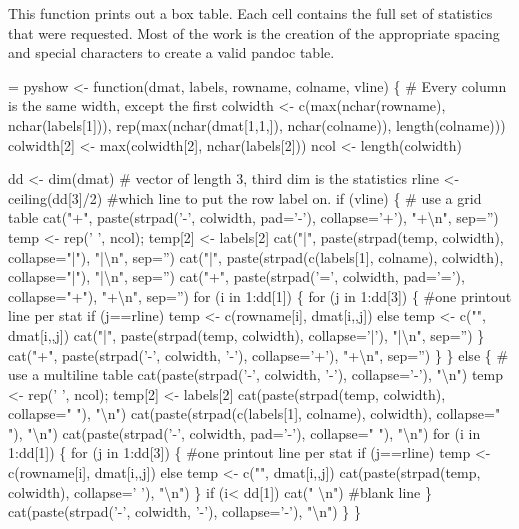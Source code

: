 \documentclass{article}
\begin{document}
This function prints out a box table.  Each cell contains the full set of
statistics that were requested.  Most of the work is the creation of
the appropriate spacing and special characters to create a valid
pandoc table.
\begin{nwchunk}
=
 pyshow <- function(dmat, labels, rowname, colname, vline) \{
     # Every column is the same width, except the first
     colwidth <- c(max(nchar(rowname), nchar(labels[1])),
                   rep(max(nchar(dmat[1,1,]), nchar(colname)), length(colname)))
     colwidth[2] <- max(colwidth[2], nchar(labels[2]))
     ncol <- length(colwidth)
 
     dd <- dim(dmat)  # vector of length 3, third dim is the statistics
     rline <- ceiling(dd[3]/2)  #which line to put the row label on.
     if (vline) \{ # use a grid table
         cat("+", paste(strpad('-', colwidth, pad='-'), collapse='+'), "+{\textbackslash}n",
             sep='')
         temp <- rep(' ', ncol); temp[2] <- labels[2]
         cat("|", paste(strpad(temp, colwidth), collapse="|"), "|{\textbackslash}n",
             sep='')
         cat("|", paste(strpad(c(labels[1], colname), colwidth), collapse="|"),
             "|{\textbackslash}n", sep='')
         cat("+", paste(strpad('=', colwidth, pad='='), collapse="+"), "+{\textbackslash}n",
             sep='')
         for (i in 1:dd[1]) \{
             for (j in 1:dd[3]) \{ #one printout line per stat
                 if (j==rline) temp <- c(rowname[i], dmat[i,,j])
                 else temp <- c("", dmat[i,,j])
                 cat("|", paste(strpad(temp, colwidth), collapse='|'), "|{\textbackslash}n",
                     sep='')
             \}
             cat("+", paste(strpad('-', colwidth, '-'), collapse='+'), "+{\textbackslash}n",
                 sep='')
         \}
     \}
     else \{ # use a multiline table
         cat(paste(strpad('-', colwidth, '-'), collapse='-'), "{\textbackslash}n")
         temp <- rep(' ', ncol); temp[2] <- labels[2]
         cat(paste(strpad(temp, colwidth), collapse=" "), "{\textbackslash}n")
         cat(paste(strpad(c(labels[1], colname), colwidth), collapse=" "),
             "{\textbackslash}n")
         cat(paste(strpad('-', colwidth, pad='-'), collapse=" "), "{\textbackslash}n")
         for (i in 1:dd[1]) \{
             for (j in 1:dd[3]) \{ #one printout line per stat
                 if (j==rline) temp <- c(rowname[i], dmat[i,,j])
                 else temp <- c("", dmat[i,,j])
                 cat(paste(strpad(temp, colwidth), collapse=' '), "{\textbackslash}n")
             \}
             if (i< dd[1]) cat(" {\textbackslash}n") #blank line
         \}
         cat(paste(strpad('-', colwidth, '-'), collapse='-'), "{\textbackslash}n")
     \}
 \}
\end{nwchunk}
\end{document}
